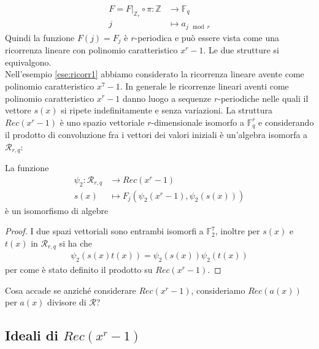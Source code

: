       \vspace{0.2cm}

\begin{align*}
F = F\bigr|_{\mathbb{Z}_{r}} \circ\pi: \mathbb{Z} &\longrightarrow \mathbb{F}_{q}  \\
              j &\longmapsto a_{j \mod{r}}
\end{align*}
Quindi la funzione $F(j) = F_{j}$ è $r$-periodica e può essere vista come una ricorrenza lineare con polinomio caratteristico $x^r -1$. Le due strutture si equivalgono.\\
Nell'esempio \ref{ese:ricorr1} abbiamo considerato la ricorrenza lineare avente come polinomio caratteristico $x^7 - 1$. In generale le ricorrenze lineari aventi come polinomio caratteristico $x^r-1$ danno luogo a sequenze $r$-periodiche nelle quali il vettore $s(x)$ si ripete indefinitamente e senza variazioni. La struttura $Rec(x^r-1)$ è uno spazio vettoriale $r$-dimensionale isomorfo a $\mathbb{F}_{q}^{r}$ e considerando il prodotto di convoluzione fra i vettori dei valori iniziali è un'algebra isomorfa a $\mathcal{R}_{r,q}$:
\begin{teorema}
   La funzione
   \begin{align*}
      \psi_{2}: \mathcal{R}_{r,q}  & \longrightarrow Rec(x^r-1)   \\
                           s(x)         &\longmapsto F_{j}(\psi_{2}(x^r-1),\psi_{2}(s(x)))
   \end{align*}
   è un isomorfismo di algebre
\end{teorema}
\begin{proof}
   I due spazi vettoriali sono entrambi isomorfi a  $\mathbb{F}_{2}^{7}$, inoltre per $s(x)$ e $t(x)$ in $\mathcal{R}_{r,q} $ si ha che
   \begin{align*}
      \psi_{2} (s(x) t(x)) = \psi_{2} (s(x)) \psi_{2} (t(x))
   \end{align*}
   per come è stato definito il prodotto su $Rec(x^r-1)$.
\end{proof}
Cosa accade se anziché considerare $Rec(x^r-1)$, consideriamo $Rec(a(x))$ per $a(x)$ divisore di $\mathcal{R}$?


\subsection{Ideali di $Rec(x^r - 1)$}





